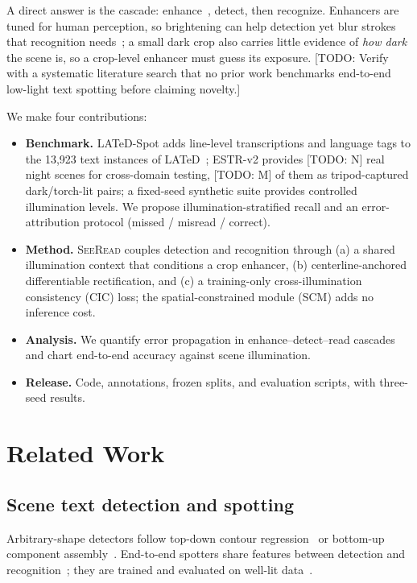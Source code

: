 \documentclass[journal]{IEEEtran}
\newcommand{\todo}[1]{{\color{red}[TODO: #1]}}
\newcommand{\method}{\textsc{SeeRead}}
\begin{document}
A direct answer is the cascade: enhance~\cite{guo2020zerodce,ma2022sci,wen2023srdace,fei2023gdp}, detect, then recognize. Enhancers are tuned for human perception, so brightening can help detection yet blur strokes that recognition needs~\cite{fu2026reading}; a small dark crop also carries little evidence of \emph{how dark} the scene is, so a crop-level enhancer must guess its exposure. \todo{Verify with a systematic literature search that no prior work benchmarks end-to-end low-light text spotting before claiming novelty.}

We make four contributions:
\begin{itemize}
\item \textbf{Benchmark.} LATeD-Spot adds line-level transcriptions and language tags to the 13{,}923 text instances of LATeD~\cite{xu2024seeing}; ESTR-v2 provides \todo{N} real night scenes for cross-domain testing, \todo{M} of them as tripod-captured dark/torch-lit pairs; a fixed-seed synthetic suite provides controlled illumination levels. We propose illumination-stratified recall and an error-attribution protocol (missed / misread / correct).
\item \textbf{Method.} \method{} couples detection and recognition through (a) a shared illumination context that conditions a crop enhancer, (b) centerline-anchored differentiable rectification, and (c) a training-only cross-illumination consistency (CIC) loss; the spatial-constrained module (SCM) adds no inference cost.
\item \textbf{Analysis.} We quantify error propagation in enhance--detect--read cascades and chart end-to-end accuracy against scene illumination.
\item \textbf{Release.} Code, annotations, frozen splits, and evaluation scripts, with three-seed results.
\end{itemize}

\section{Related Work}
\subsection{Scene text detection and spotting}
Arbitrary-shape detectors follow top-down contour regression~\cite{liao2020db,zhang2021textbpn,zhang2023bpnpp,ye2023dptext} or bottom-up component assembly~\cite{xu2024seeing}. End-to-end spotters share features between detection and recognition~\cite{liu2020abcnet,zhang2022testr,ye2023deepsolo,huang2023estextspotter}; they are trained and evaluated on well-lit data~\cite{liu2019ctw1500,chng2017totaltext}.
\end{document}
